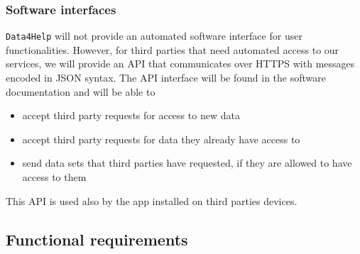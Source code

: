 
    \subsubsection{Software interfaces}

      \texttt{Data4Help} will not provide an automated software interface for user functionalities. However, for third parties that need automated access to our services, we will provide an API that communicates over HTTPS with messages encoded in JSON syntax. The API interface will be found in the software documentation and will be able to
      \begin{itemize}
        \item accept third party requests for access to new data
        \item accept third party requests for data they already have access to
        \item send data sets that third parties have requested, if they are allowed to have access to them
      \end{itemize}
      This API is used also by the app installed on third parties devices.


  \subsection{Functional requirements}

